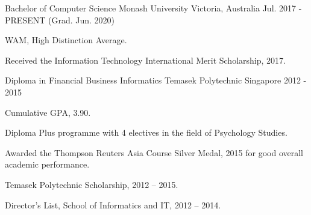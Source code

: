 \begin{cventries}
  \cventry
    {Bachelor of Computer Science}
    {Monash University}
    {Victoria, Australia}
    {Jul. 2017 - PRESENT (Grad. Jun. 2020)}
    {
      \begin{cvitems}
        \item {WAM, High Distinction Average.}
        \item {Received the Information Technology International Merit Scholarship, 2017.}
      \end{cvitems}
    }
    
    \cventry
    {Diploma in Financial Business Informatics}
    {Temasek Polytechnic}
    {Singapore}
    {2012 - 2015}
    {
      \begin{cvitems}
        \item {Cumulative GPA, 3.90.}
        \item {Diploma Plus programme with 4 electives in the field of Psychology Studies.}
        \item {Awarded the Thompson Reuters Asia Course Silver Medal, 2015 for good overall academic performance.}
        \item {Temasek Polytechnic Scholarship, 2012 – 2015.}
        \item {Director’s List, School of Informatics and IT, 2012 – 2014.}
      \end{cvitems}
    }
\end{cventries}
  
